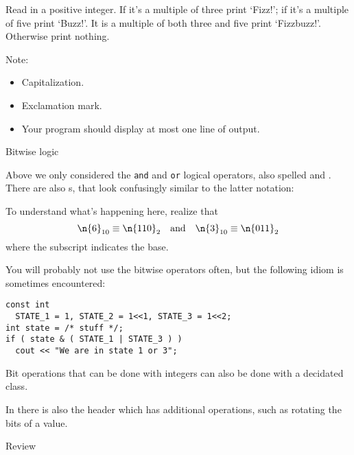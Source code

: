 \begin{exercise}
  \label{ex:fizzbuzz}
  Read in a positive integer. If it's a multiple of three print `Fizz!';
  if it's a multiple of five print `Buzz!'.
  It is a multiple of both three and five print `Fizzbuzz!'.
  Otherwise print nothing.

  Note:
  \begin{itemize}
  \item Capitalization.
  \item Exclamation mark.
  \item Your program should display at most one line of output.
  \end{itemize}
\end{exercise}


 {Bitwise logic}
\label{sec:bitc}

Above we only considered the \lstinline{and} and \lstinline{or} logical operators,
also spelled \n{&&} and \n{||}.
There are also s,
that look confusingly similar to the latter notation:


To understand what's happening here, realize that
\[ \n{6}_{10}\equiv \n{110}_2 \quad\hbox{and}\quad \n{3}_{10}\equiv\n{011}_2 \]
where the subscript indicates the base.

You will probably not use the bitwise operators often, but
the following idiom is sometimes encountered:
\begin{lstlisting}
const int
  STATE_1 = 1, STATE_2 = 1<<1, STATE_3 = 1<<2;
int state = /* stuff */;
if ( state & ( STATE_1 | STATE_3 ) )
  cout << "We are in state 1 or 3";
\end{lstlisting}


Bit operations that can be done with integers
can also be done with a decidated  class.
%

In  there is also the  header
which has additional operations, such as rotating the bits of a value.


 {Review}

